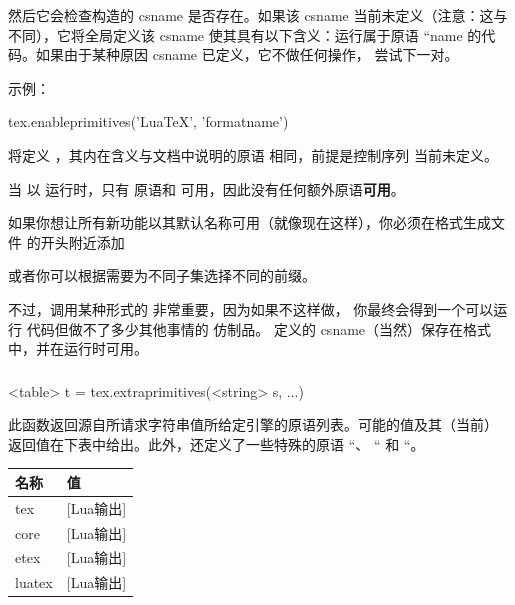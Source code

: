 然后它会检查构造的 csname 是否存在。如果该 csname 当前未定义（注意：这与
 不同），它将全局定义该 csname 使其具有以下含义：运行属于原语
``name 的代码。如果由于某种原因 csname 已定义，它不做任何操作，
尝试下一对。

示例：

\begin{typing}
tex.enableprimitives('LuaTeX', {'formatname'})
\end{typing}

将定义 \type {\LuaTeXformatname}，其内在含义与文档中说明的原语
 相同，前提是控制序列 \type {\LuaTeXformatname} 当前未定义。

当 \LUATEX 以  运行时，只有  原语和 
可用，因此没有任何额外原语{\bf 可用}。

如果你想让所有新功能以其默认名称可用（就像现在这样），你必须在格式生成文件
的开头附近添加

\begin{typing}
\ifx\directlua\undefined \else
\fi
\end{typing}

或者你可以根据需要为不同子集选择不同的前缀。

不过，调用某种形式的  非常重要，因为如果不这样做，
你最终会得到一个可以运行 \LUA 代码但做不了多少其他事情的  仿制品。
定义的 csname（当然）保存在格式中，并在运行时可用。

\subsubsection{}


\begin{typing}
<table> t = tex.extraprimitives(<string> s, ...)
\end{typing}

此函数返回源自所请求字符串值所给定引擎的原语列表。可能的值及其（当前）
返回值在下表中给出。此外，还定义了一些特殊的原语 ``\tex{ }、
``\tex {/} 和 ``\type {-}。


\begin{longtable}{l p{8cm}}
\toprule 名称    & 值 \\
\midrule
tex     & [Lua输出] \\
core    & [Lua输出] \\
etex    & [Lua输出] \\
luatex  & [Lua输出] \\
\bottomrule
\end{longtable}

